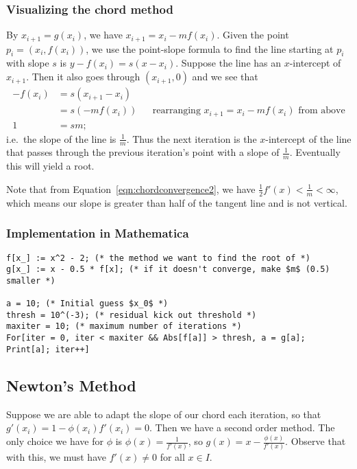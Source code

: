 \documentclass[12pt,letterpaper,DIV=11]{scrartcl}
\theoremstyle{plain}
\theoremstyle{definition}
\theoremstyle{remark}
\begin{document}
\subsubsection{Visualizing the chord method}
By $x_{i + 1} = g(x_i)$, we have $x_{i + 1} = x_i - m f(x_i)$.
Given the point $p_i = (x_i, f(x_i))$, we use the point-slope formula to find the line starting at $p_i$ with slope $s$ is $y - f(x_i) = s (x - x_i)$.
Suppose the line has an $x$-intercept of $x_{i + 1}$.
Then it also goes through $(x_{i + 1}, 0)$ and we see that \begin{align*}
  - f(x_i) &= s (x_{i + 1} - x_i) \\
           &= s (-m f(x_i)) && \text{rearranging $x_{i + 1} = x_i - m f(x_i)$ from above} \\
  1 &= sm;
\end{align*} i.e.\ the slope of the line is $\frac{1}{m}$.
Thus the next iteration is the $x$-intercept of the line that passes through the previous iteration's point with a slope of $\frac{1}{m}$.
Eventually this will yield a root.

Note that from Equation~\ref{eqn:chordconvergence2}, we have $\frac{1}{2} f'(x) < \frac{1}{m} < \infty$, which means our slope is greater than half of the tangent line and is not vertical.

\subsubsection{Implementation in Mathematica}
\begin{verbatim}
f[x_] := x^2 - 2; (* the method we want to find the root of *)
g[x_] := x - 0.5 * f[x]; (* if it doesn't converge, make $m$ (0.5) smaller *)

a = 10; (* Initial guess $x_0$ *)
thresh = 10^(-3); (* residual kick out threshold *)
maxiter = 10; (* maximum number of iterations *)
For[iter = 0, iter < maxiter && Abs[f[a]] > thresh, a = g[a]; Print[a]; iter++]
\end{verbatim}

\subsection{Newton's Method}
Suppose we are able to adapt the slope of our chord each iteration, so that $g'(x_i) = 1 - \phi(x_i) f'(x_i) = 0$.
Then we have a second order method.
The only choice we have for $\phi$ is $\phi(x) = \frac{1}{f'(x)}$, so $g(x) = x - \frac{\phi(x)}{f'(x)}$.
Observe that with this, we must have $f'(x) \neq 0$ for all $x \in I$.
\end{document}
